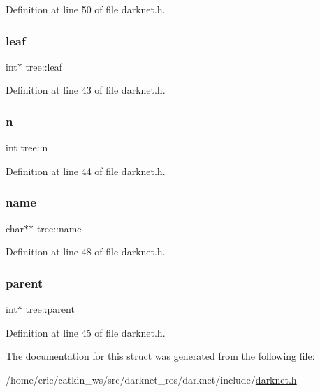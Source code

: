 Definition at line 50 of file darknet.\+h.

\mbox{\label{structtree_a08371bc037edecea4f1632c2185b1ff1}} 
\subsubsection{\texorpdfstring{leaf}{leaf}}
{\footnotesize\ttfamily int$\ast$ tree\+::leaf}



Definition at line 43 of file darknet.\+h.

\mbox{\label{structtree_a2273fc7497601bfaf9121d1a797453b5}} 
\subsubsection{\texorpdfstring{n}{n}}
{\footnotesize\ttfamily int tree\+::n}



Definition at line 44 of file darknet.\+h.

\mbox{\label{structtree_aef62d17752842a143625d7313073c068}} 
\subsubsection{\texorpdfstring{name}{name}}
{\footnotesize\ttfamily char$\ast$$\ast$ tree\+::name}



Definition at line 48 of file darknet.\+h.

\mbox{\label{structtree_a77b1eb5cb07b504420034ed006f75cb5}} 
\subsubsection{\texorpdfstring{parent}{parent}}
{\footnotesize\ttfamily int$\ast$ tree\+::parent}



Definition at line 45 of file darknet.\+h.



The documentation for this struct was generated from the following file\+:\begin{DoxyCompactItemize}
\item 
/home/eric/catkin\+\_\+ws/src/darknet\+\_\+ros/darknet/include/\mbox{\hyperlink{darknet_8h}{darknet.\+h}}\end{DoxyCompactItemize}
